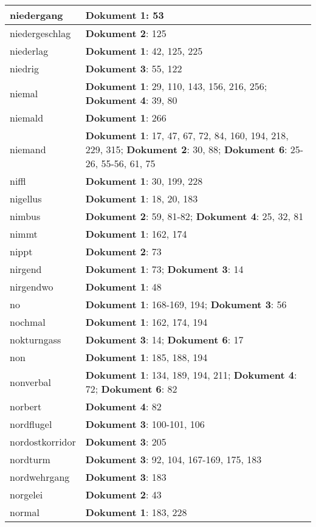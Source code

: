 \documentclass[a5paper]{article}
\begin{document}
\begin{longtable}[l]{|l|p{3in}|}
\hline
niedergang & \textbf{Dokument 1}: 53 \\
\hline
niedergeschlag & \textbf{Dokument 2}: 125 \\
\hline
niederlag & \textbf{Dokument 1}: 42, 125, 225 \\
\hline
niedrig & \textbf{Dokument 3}: 55, 122 \\
\hline
niemal & \textbf{Dokument 1}: 29, 110, 143, 156, 216, 256; \textbf{Dokument 4}: 39, 80 \\
\hline
niemald & \textbf{Dokument 1}: 266 \\
\hline
niemand & \textbf{Dokument 1}: 17, 47, 67, 72, 84, 160, 194, 218, 229, 315; \textbf{Dokument 2}: 30, 88; \textbf{Dokument 6}: 25-26, 55-56, 61, 75 \\
\hline
niffl & \textbf{Dokument 1}: 30, 199, 228 \\
\hline
nigellus & \textbf{Dokument 1}: 18, 20, 183 \\
\hline
nimbus & \textbf{Dokument 2}: 59, 81-82; \textbf{Dokument 4}: 25, 32, 81 \\
\hline
nimmt & \textbf{Dokument 1}: 162, 174 \\
\hline
nippt & \textbf{Dokument 2}: 73 \\
\hline
nirgend & \textbf{Dokument 1}: 73; \textbf{Dokument 3}: 14 \\
\hline
nirgendwo & \textbf{Dokument 1}: 48 \\
\hline
no & \textbf{Dokument 1}: 168-169, 194; \textbf{Dokument 3}: 56 \\
\hline
nochmal & \textbf{Dokument 1}: 162, 174, 194 \\
\hline
nokturngass & \textbf{Dokument 3}: 14; \textbf{Dokument 6}: 17 \\
\hline
non & \textbf{Dokument 1}: 185, 188, 194 \\
\hline
nonverbal & \textbf{Dokument 1}: 134, 189, 194, 211; \textbf{Dokument 4}: 72; \textbf{Dokument 6}: 82 \\
\hline
norbert & \textbf{Dokument 4}: 82 \\
\hline
nordflugel & \textbf{Dokument 3}: 100-101, 106 \\
\hline
nordostkorridor & \textbf{Dokument 3}: 205 \\
\hline
nordturm & \textbf{Dokument 3}: 92, 104, 167-169, 175, 183 \\
\hline
nordwehrgang & \textbf{Dokument 3}: 183 \\
\hline
norgelei & \textbf{Dokument 2}: 43 \\
\hline
normal & \textbf{Dokument 1}: 183, 228 \\

\end{longtable}
\end{document}
